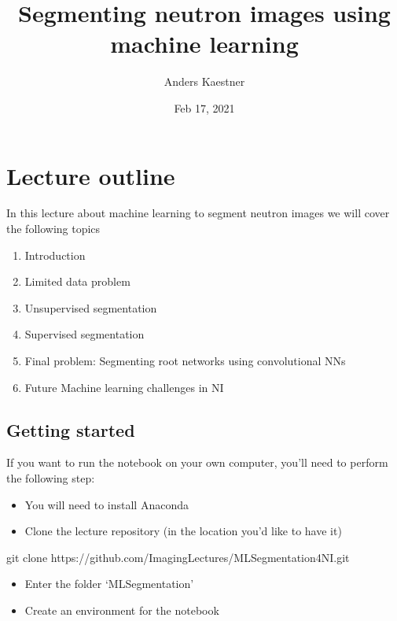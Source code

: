 \documentclass[letterpaper,10pt,english]{sphinxmanual}
\title{Segmenting neutron images using machine learning}
\date{Feb 17, 2021}
\author{Anders Kaestner}
\begin{document}
\pagestyle{empty}
\sphinxmaketitle
\pagestyle{plain}
\sphinxtableofcontents
\pagestyle{normal}
\label{\detokenize{ML4NeutronImageSegmentation::doc}}





\chapter{Lecture outline}
\label{\detokenize{ML4NeutronImageSegmentation:lecture-outline}}
In this lecture about machine learning to segment neutron images we will cover the following topics
\begin{enumerate}
%
\item {} 
Introduction

\item {} 
Limited data problem

\item {} 
Unsupervised segmentation

\item {} 
Supervised segmentation

\item {} 
Final problem: Segmenting root networks using convolutional NNs

\item {} 
Future Machine learning challenges in NI

\end{enumerate}


\section{Getting started}
\label{\detokenize{ML4NeutronImageSegmentation:getting-started}}
If you want to run the notebook on your own computer, you’ll need to perform the following step:
\begin{itemize}
\item {} 
You will need to install Anaconda

\item {} 
Clone the lecture repository (in the location you’d like to have it)

\end{itemize}

\begin{sphinxVerbatim}[commandchars=\\\{\}]
git clone https://github.com/ImagingLectures/MLSegmentation4NI.git
\end{sphinxVerbatim}
\begin{itemize}
\item {} 
Enter the folder ‘MLSegmentation’

\item {} 
Create an environment for the notebook

\end{itemize}
\end{document}
